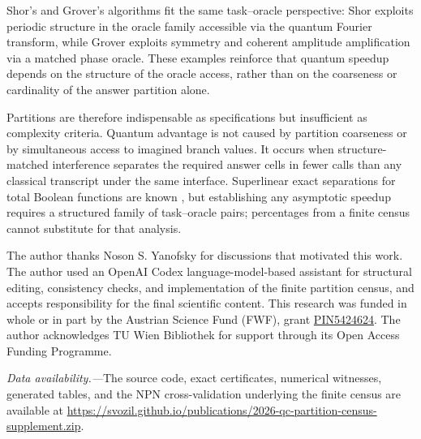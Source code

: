 \documentclass[
  aps,
  prl,
  reprint,
  nofootinbib
]{revtex4-2}
\begin{document}
Shor's and Grover's algorithms fit the same task--oracle perspective: Shor
exploits periodic structure in the oracle family accessible via the quantum Fourier transform,
while Grover exploits symmetry and coherent amplitude amplification via a matched phase oracle.
These examples reinforce that
quantum speedup depends on the structure of the oracle access, rather than on
the coarseness or cardinality of the answer partition alone.

Partitions are therefore indispensable as specifications but insufficient as
complexity criteria. Quantum advantage is not caused by partition coarseness
or by simultaneous access to imagined branch values. It occurs when
structure-matched interference separates the required answer cells in fewer
calls than any classical transcript under the same interface. Superlinear
exact separations for total Boolean functions are known
\cite{Ambainis2016SuperlinearExact}, but establishing any asymptotic speedup
requires a structured family of task--oracle pairs; percentages from a finite
census cannot substitute for that analysis.

\begin{acknowledgments}
The author thanks Noson S. Yanofsky for discussions that motivated this
work. The author used an OpenAI Codex language-model-based assistant for
structural editing, consistency checks, and implementation of the finite
partition census, and accepts responsibility for the final scientific
content. This research was funded in whole or in part by the
Austrian Science Fund (FWF), grant
\href{https://doi.org/10.55776/PIN5424624}{PIN5424624}. The author
acknowledges TU Wien Bibliothek for support through its Open Access Funding
Programme.
\end{acknowledgments}

\noindent\textit{Data availability.---}The source code, exact certificates,
numerical witnesses, generated tables, and the NPN cross-validation underlying
the finite census are available at
\href{https://svozil.github.io/publications/2026-qc-partition-census-supplement.zip}{https://svozil.github.io/publications/2026-qc-partition-census-supplement.zip}.


\end{document}
